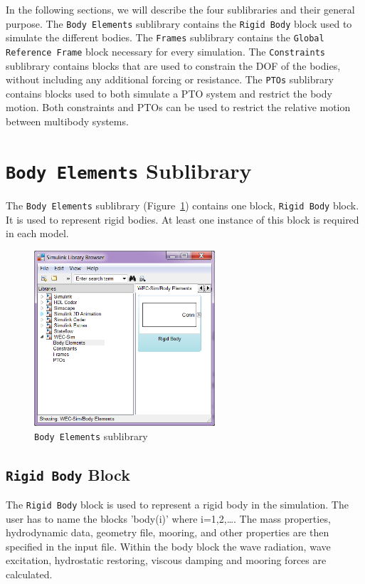     In the following sections, we will describe the four sublibraries and their general purpose.
    The \texttt{Body Elements} sublibrary contains the \texttt{Rigid Body} block 
    used to simulate the different bodies. The \texttt{Frames} sublibrary contains the 
    \texttt{Global Reference Frame} block necessary for every simulation. The \texttt{Constraints} 
    sublibrary contains blocks that are used to constrain the DOF of the bodies, without including 
    any additional forcing or resistance. The \texttt{PTOs} sublibrary contains blocks used to both 
    simulate a PTO system and restrict the body motion. Both constraints and PTOs can be used 
    to restrict the relative motion between multibody systems.
 
    \section{\texttt{Body Elements} Sublibrary}
    The \texttt{Body Elements} sublibrary (Figure~\ref{fig:bLib}) 
    contains one block, \texttt{Rigid Body} block. It is used to 
    represent rigid bodies. At least one instance of this block is required in 
    each model.
	
    \begin{figure}[H]        
    \centering        
    \includegraphics[width=0.6\textwidth]{libraryStructure/figures/bodiesLib}        
    \caption{\texttt{Body Elements} sublibrary}        
    \label{fig:bLib}        
    \end{figure}

        \subsection{\texttt{Rigid Body} Block}
        The \texttt{Rigid Body} block is used to represent a rigid body in the 
		simulation.
		The user has to name the blocks 'body(i)' where i=1,2,\ldots. 
		The mass properties, hydrodynamic data, geometry file, mooring, and 
		other properties are then specified in the input file. Within the body 
		block the wave radiation, wave excitation, hydrostatic restoring, viscous damping and mooring forces are calculated.

